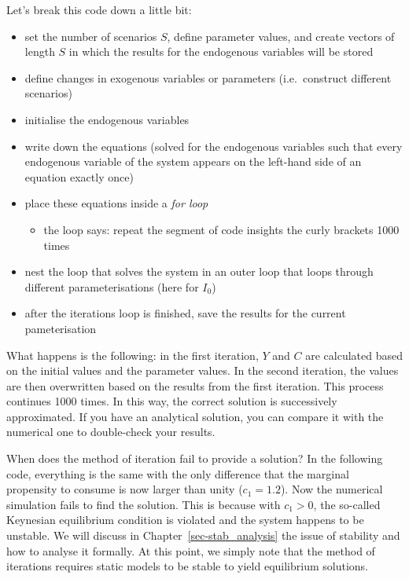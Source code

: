 \documentclass[
  letterpaper,
  DIV=11,
  numbers=noendperiod]{scrreprt}
\providecommand{\tightlist}{%
  \setlength{\itemsep}{0pt}\setlength{\parskip}{0pt}}\usepackage{longtable,booktabs,array}
\begin{document}
Let's break this code down a little bit:

\begin{itemize}
\item
  set the number of scenarios \(S\), define parameter values, and create
  vectors of length \(S\) in which the results for the endogenous
  variables will be stored
\item
  define changes in exogenous variables or parameters (i.e.~construct
  different scenarios)
\item
  initialise the endogenous variables
\item
  write down the equations (solved for the endogenous variables such
  that every endogenous variable of the system appears on the left-hand
  side of an equation exactly once)
\item
  place these equations inside a \emph{for loop}

  \begin{itemize}
  \tightlist
  \item
    the loop says: repeat the segment of code insights the curly
    brackets 1000 times
  \end{itemize}
\item
  nest the loop that solves the system in an outer loop that loops
  through different parameterisations (here for \(I_0\))
\item
  after the iterations loop is finished, save the results for the
  current pameterisation
\end{itemize}

What happens is the following: in the first iteration, \(Y\) and \(C\)
are calculated based on the initial values and the parameter values. In
the second iteration, the values are then overwritten based on the
results from the first iteration. This process continues 1000 times. In
this way, the correct solution is successively approximated. If you have
an analytical solution, you can compare it with the numerical one to
double-check your results.

When does the method of iteration fail to provide a solution? In the
following code, everything is the same with the only difference that the
marginal propensity to consume is now larger than unity (\(c_1=1.2\)).
Now the numerical simulation fails to find the solution. This is because
with \(c_1>0\), the so-called Keynesian equilibrium condition is
violated and the system happens to be unstable. We will discuss in
Chapter~\ref{sec-stab_analysis} the issue of stability and how to
analyse it formally. At this point, we simply note that the method of
iterations requires static models to be stable to yield equilibrium
solutions.
\end{document}
